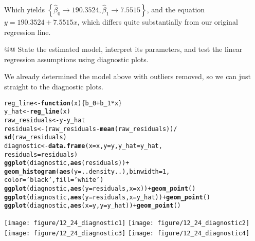 \documentclass[10pt]{article}\usepackage[]{graphicx}\usepackage[]{xcolor}
\makeatletter
\newcommand{\hlnum}[1]{\textcolor[rgb]{0.686,0.059,0.569}{#1} }%
\newcommand{\hlstr}[1]{\textcolor[rgb]{0.192,0.494,0.8}{#1} }%
\newcommand{\hlopt}[1]{\textcolor[rgb]{0,0,0}{#1} }%
\newcommand{\hlstd}[1]{\textcolor[rgb]{0.345,0.345,0.345}{#1} }%
\newcommand{\hlkwa}[1]{\textcolor[rgb]{0.161,0.373,0.58}{\textbf{#1} } }%
\newcommand{\hlkwb}[1]{\textcolor[rgb]{0.69,0.353,0.396}{#1} }%
\newcommand{\hlkwc}[1]{\textcolor[rgb]{0.333,0.667,0.333}{#1} }%
\newcommand{\hlkwd}[1]{\textcolor[rgb]{0.737,0.353,0.396}{\textbf{#1} } }%
\newenvironment{kframe}{%
 \def\at@end@of@kframe{}%
 \ifinner\ifhmode%
  \def\at@end@of@kframe{\end{minipage} }%
  \begin{minipage}{\columnwidth}%
 \fi\fi%
 \def\FrameCommand##1{\hskip\@totalleftmargin \hskip-\fboxsep
 \colorbox{shadecolor}{##1}\hskip-\fboxsep
     \hskip-\linewidth \hskip-\@totalleftmargin \hskip\columnwidth}%
 \MakeFramed {\advance\hsize-\width
   \@totalleftmargin\z@ \linewidth\hsize
   \@setminipage} }%
 {\par\unskip\endMakeFramed%
 \at@end@of@kframe}
\newenvironment{knitrout}{}{} %
\makeatother
\begin{document}
\begin{easylist}[enumerate]
    Which yields $\boxed{\left\{ \hat{\beta}_0 \to 190.3524, \hat{\beta}_1 \to 7.5515 \right\} }$, and the
    equation $y = 190.3524 + 7.5515 x$, which differs quite substantially from our original regression line.

    @@ State the estimated model, interpret its parameters, and test the linear regression assumptions using diagnostic
    plots.\newline

    We already determined the model above with outliers removed, so we can just straight to the diagnostic plots.

\begin{knitrout}
\color{fgcolor}\begin{kframe}
\begin{alltt}
         \hlstd{reg_line} \hlkwb{<-} \hlkwa{function}\hlstd{(}\hlkwc{x}\hlstd{) \{ b_0} \hlopt{+} \hlstd{b_1} \hlopt{*} \hlstd{x \} }
         \hlstd{y_hat} \hlkwb{<-} \hlkwd{reg_line}\hlstd{(x)}
         \hlstd{raw_residuals} \hlkwb{<-} \hlstd{y} \hlopt{-} \hlstd{y_hat}
         \hlstd{residuals} \hlkwb{<-} \hlstd{(raw_residuals} \hlopt{-} \hlkwd{mean}\hlstd{(raw_residuals))} \hlopt{/}
                         \hlkwd{sd}\hlstd{(raw_residuals)}
         \hlstd{diagnostic} \hlkwb{<-} \hlkwd{data.frame}\hlstd{(}\hlkwc{x}\hlstd{=x,} \hlkwc{y}\hlstd{=y,} \hlkwc{y_hat}\hlstd{=y_hat,}
                                  \hlkwc{residuals}\hlstd{=residuals)}
         \hlkwd{ggplot}\hlstd{(diagnostic,} \hlkwd{aes}\hlstd{(residuals))} \hlopt{+}
             \hlkwd{geom_histogram}\hlstd{(}\hlkwd{aes}\hlstd{(}\hlkwc{y}\hlstd{=..density..),} \hlkwc{binwidth}\hlstd{=}\hlnum{1}\hlstd{,}
                            \hlkwc{color}\hlstd{=}\hlstr{'black'}\hlstd{,} \hlkwc{fill}\hlstd{=}\hlstr{'white'}\hlstd{)}
         \hlkwd{ggplot}\hlstd{(diagnostic,} \hlkwd{aes}\hlstd{(}\hlkwc{y}\hlstd{=residuals,} \hlkwc{x}\hlstd{=x))} \hlopt{+} \hlkwd{geom_point}\hlstd{()}
         \hlkwd{ggplot}\hlstd{(diagnostic,} \hlkwd{aes}\hlstd{(}\hlkwc{y}\hlstd{=residuals,} \hlkwc{x}\hlstd{=y_hat))} \hlopt{+} \hlkwd{geom_point}\hlstd{()}
         \hlkwd{ggplot}\hlstd{(diagnostic,} \hlkwd{aes}\hlstd{(}\hlkwc{x}\hlstd{=y,} \hlkwc{y}\hlstd{=y_hat))} \hlopt{+} \hlkwd{geom_point}\hlstd{()}
\end{alltt}
\end{kframe}

{\centering \texttt{[image: figure/12\_24\_diagnostic1]} 
\texttt{[image: figure/12\_24\_diagnostic2]} 
\texttt{[image: figure/12\_24\_diagnostic3]} 
\texttt{[image: figure/12\_24\_diagnostic4]} 

}
\end{knitrout}
\end{easylist}
\end{document}
